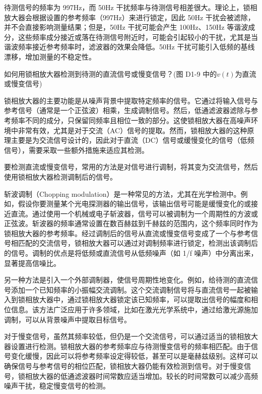 \documentclass[dvipsnames, svgnames,a4paper,11pt]{article}
\begin{document}
待测信号的频率为 997Hz，而 50Hz 干扰频率与待测信号相差很大。理论上，锁相放大器会根据设置的参考频率（997Hz）来进行锁定，因此 50Hz 干扰会被滤除，并不会直接影响测量结果；但是，50Hz 干扰可能会产生 100Hz、150Hz 等谐波成分，这些频率成分接近或落在待测信号附近时，可能会引起较小的干扰，尤其是当谐波频率接近参考频率时，滤波器的效果会降低。50Hz 干扰可能引入低频的基线漂移，增加测量的不稳定性。

	


\begin{question}
	如何用锁相放大器检测到待测的直流信号或慢变信号？(图 D1-9 中的$v(t)$为直流或慢变信号)
\end{question}

锁相放大器的主要功能是从噪声背景中提取特定频率的信号。它通过将输入信号与参考信号（通常是一个正弦波）相乘，生成调制信号。然后，低通滤波器滤除与参考频率不同的成分，只保留同频率且相位一致的部分。这使锁相放大器在高噪声环境中非常有效，尤其是对于交流（AC）信号的提取。然而，锁相放大器的这种原理主要是为交流信号设计的，因此对于直流（DC）信号或缓慢变化的信号（低频信号），需要采取一些额外措施来适应其检测。

要检测直流或慢变信号，常用的方法是对信号进行调制，将其变为交流信号，然后使用锁相放大器检测调制后的信号。

斩波调制（Chopping modulation）是一种常见的方法，尤其在光学检测中。例如，假设你要测量某个光电探测器的输出信号，该输出信号可能是缓慢变化的或接近直流。通过使用一个机械或电子斩波器，信号可以被调制为一个周期性的方波或正弦波。斩波器的频率通常设置在数百赫兹到千赫兹的范围内，这个频率同时作为锁相放大器的参考频率。经过调制后的信号从直流或慢变信号变成了一个与参考信号相匹配的交流信号，锁相放大器可以通过对调制频率进行锁定，检测出该调制后的信号。调制的优点是将低频或直流信号从低频噪声（如 1/f 噪声）中分离出来，显著提高信噪比。

另一种方法是引入一个外部调制器，使信号周期性地变化。例如，给待测的直流信号添加一个已知频率的小振幅交流调制。这个交流调制信号将与直流信号一起被输入到锁相放大器中，通过锁相放大器锁定该已知频率，可以提取出信号的幅度和相位信息。该方法广泛应用于许多领域，比如在激光光学系统中，通过给激光源施加调制，可以从背景噪声中提取目标信号。

对于慢变信号，虽然其频率较低，但仍是一个交流信号，可以通过适当的锁相放大器设置进行检测。锁相放大器的参考频率应与待测慢变信号的频率相匹配。由于信号变化缓慢，因此可以将参考频率设定得较低，甚至可以是毫赫兹级别。这样可以确保信号与参考信号的相位匹配，锁相放大器仍能有效检测到信号。对于慢变信号，锁相放大器的低通滤波器时间常数应适当增加。较长的时间常数可以减少高频噪声干扰，稳定慢变信号的检测。
\end{document}
